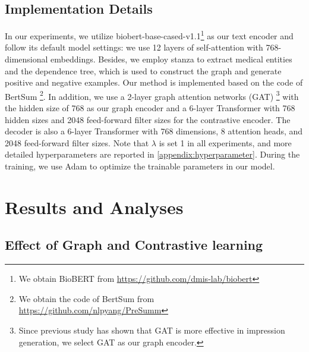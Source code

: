 \documentclass[11pt]{article}
\begin{document}
\subsection{Implementation Details}
In our experiments, we utilize biobert-base-cased-v1.1\footnote{We obtain BioBERT from \url{https://github.com/dmis-lab/biobert}} as our text encoder and follow its default model settings: we use 12 layers of self-attention with 768-dimensional embeddings.
%
Besides, we employ stanza \cite{zhang2020biomedical} to extract medical entities and the dependence tree, which is used to construct the graph and generate positive and negative examples.
%
Our method is implemented based on the code of BertSum \cite{liu2019text}\footnote{We obtain the code of BertSum from \url{https://github.com/nlpyang/PreSumm}}.
%
In addition, we use a 2-layer graph attention networks (GAT) \cite{velivckovic2017graph}\footnote{Since previous study \cite{hu2021word} has shown that GAT \cite{velivckovic2017graph} is more effective in impression generation, we select GAT as our graph encoder.} with the hidden size of 768 as our graph encoder and a 6-layer Transformer with 768 hidden sizes and 2048 feed-forward filter sizes for the contrastive encoder.
%
The decoder is also a 6-layer Transformer with 768 dimensions, 8 attention heads, and 2048 feed-forward filter sizes.
%
Note that $\lambda$ is set 1 in all experiments, and more detailed hyperparameters are reported in \ref{appendix:hyperparameter}.
%
During the training, we use Adam \cite{kingma2014adam} to optimize the trainable parameters in our model.
%

\section{Results and Analyses}

\subsection{Effect of Graph and Contrastive learning}
\end{document}
